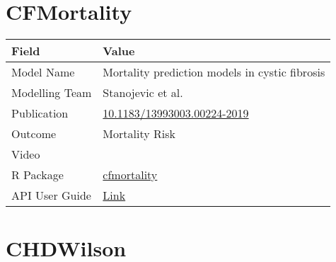 \documentclass[
]{book}
\begin{document}
\hypertarget{cfmortality}{%
\chapter{CFMortality}\label{cfmortality}}

\begin{longtable}[]{@{}ll@{}}
\toprule
Field & Value\tabularnewline
\midrule
\endhead
Model Name & Mortality prediction models in cystic fibrosis\tabularnewline
Modelling Team & Stanojevic et al.\tabularnewline
Publication & \href{https://doi.org/10.1183/13993003.00224-2019}{10.1183/13993003.00224-2019}\tabularnewline
Outcome & Mortality Risk\tabularnewline
Video & \href{}{}\tabularnewline
R Package & \href{https://cran.r-project.org/package=cfmortality}{cfmortality}\tabularnewline
API User Guide & \href{https://resplab.github.io/prismguide/api-users-guide.html\#cfmortality-1}{Link}\tabularnewline
\bottomrule
\end{longtable}

\hypertarget{chdwilson}{%
\chapter{CHDWilson}\label{chdwilson}}
\end{document}
